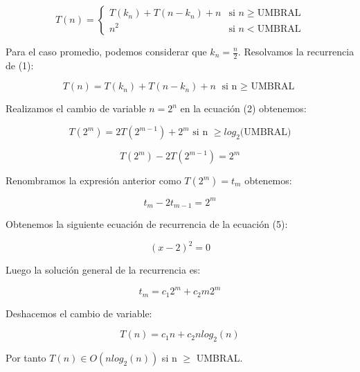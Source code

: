 \documentclass{homework}
\begin{document}
    \begin{equation}
        T(n) = \left\{ \begin{array}{lr} T(k_n) + T(n-k_n) + n & \text{si } n \geq \text{UMBRAL}\\ n^2 & \text{si } n < \text{UMBRAL} \end{array} \right.
    \end{equation}

    Para el caso promedio, podemos considerar que $k_{n} = \frac{n}{2}$. Resolvamos la recurrencia de (1):
    
    \begin{equation}
        T(n) = T(k_n) + T(n-k_n) + n \text{ si n $\geq$ UMBRAL}
    \end{equation}

    Realizamos el cambio de variable $n = 2^{n}$ en la ecuación (2) obtenemos:

    \begin{equation}
        T(2^{m}) = 2T(2^{m-1}) + 2^{m} \text{ si n $\geq log_{2}$(UMBRAL)} 
    \end{equation}

    \begin{equation}
        T(2^{m}) - 2T(2^{m-1}) = 2^{m}
    \end{equation}

    Renombramos la expresión anterior como $T(2^{m}) = t_{m}$ obtenemos:

    \begin{equation}
        t_{m} - 2t_{m-1} = 2^{m}
    \end{equation}
    
    Obtenemos la siguiente ecuación de recurrencia de la ecuación (5):

    \begin{equation}
        (x-2)^{2} = 0
    \end{equation}

    Luego la solución general de la recurrencia es:

    \begin{equation}
        t_{m} = c_{1}2^{m} + c_{2}m2^{m}
    \end{equation}

    Deshacemos el cambio de variable:

    \begin{equation}
        T(n) = c_{1}n + c_{2}nlog_{2}(n)
    \end{equation}

    Por tanto $T(n) \in O(nlog_{2}(n))$ si n $\geq$ UMBRAL.
\end{document}
